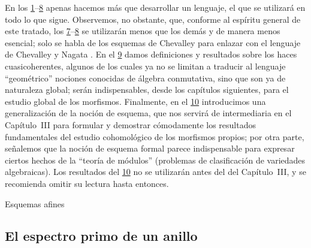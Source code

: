 \documentclass[oneside]{amsart}
\makeatletter
\theoremstyle{ega-env-style}
\theoremstyle{ega-thm-env-style}
\theoremstyle{ega-defn-env-style}
\def\section{\@startsection{section}{1}%
  \z@{.7\linespacing\@plus\linespacing}{.5\linespacing}%
  {\normalfont\bfseries\Large\scshape\centering}}
\newcommand{\oldpage}[2][]{{\marginnote{\normalfont{\textbf{#1}~|~#2}}}\ignorespaces}
\let\EGAOriginalLabel\label
\renewcommand{\label}[1]{\phantomsection\EGAOriginalLabel{#1}}
\makeatother
\begin{document}
\oldpage[I]{79}
\label{chapter:I-fr}
En los \textsection\textsection\hyperref[section:I.1]{1}--\hyperref[section:I.8]{8} apenas hacemos más que desarrollar un lenguaje, el que se utilizará en todo lo que sigue.
Observemos, no obstante, que, conforme al espíritu general de este tratado, los \textsection\textsection\hyperref[section:I.7]{7}--\hyperref[section:I.8]{8} se utilizarán menos que los demás y de manera menos esencial; solo se habla de los esquemas de Chevalley para enlazar con el lenguaje de Chevalley \cite{I-1} y Nagata \cite{I-9}.
En el \textsection\hyperref[section:I.9]{9} damos definiciones y resultados sobre los haces cuasicoherentes, algunos de los cuales ya no se limitan a traducir al lenguaje ``geométrico'' nociones conocidas de álgebra conmutativa, sino que son ya de naturaleza global; serán indispensables, desde los capítulos siguientes, para el estudio global de los morfismos.
Finalmente, en el \textsection\hyperref[section:I.10]{10} introducimos una generalización de la noción de esquema, que nos servirá de intermediaria en el Capítulo~III para formular y demostrar cómodamente los resultados fundamentales del estudio cohomológico de los morfismos propios;
por otra parte, señalemos que la noción de esquema formal parece indispensable para expresar ciertos hechos de la ``teoría de módulos'' (problemas de clasificación de variedades algebraicas).
Los resultados del \textsection\hyperref[section:I.10]{10} no se utilizarán antes del  del Capítulo~III, y se recomienda omitir su lectura hasta entonces.
\bigskip

\setcounter{section}{0}
\section{Esquemas afines}
\label{section:I.1}

\setcounter{subsection}{0}
\subsection{El espectro primo de un anillo}
\label{subsection:I.1.1}
\end{document}
